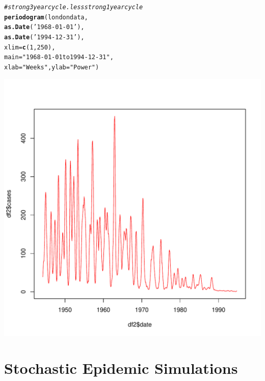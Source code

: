 \documentclass[12pt]{article}\usepackage[]{graphicx}\usepackage[]{color}
\makeatletter
\def\maxwidth{ %
  \ifdim\Gin@nat@width>\linewidth
    \linewidth
  \else
    \Gin@nat@width
  \fi
}
\newcommand{\hlnum}[1]{\textcolor[rgb]{0.686,0.059,0.569}{#1}}%
\newcommand{\hlstr}[1]{\textcolor[rgb]{0.192,0.494,0.8}{#1}}%
\newcommand{\hlcom}[1]{\textcolor[rgb]{0.678,0.584,0.686}{\textit{#1}}}%
\newcommand{\hlstd}[1]{\textcolor[rgb]{0.345,0.345,0.345}{#1}}%
\newcommand{\hlkwc}[1]{\textcolor[rgb]{0.333,0.667,0.333}{#1}}%
\newcommand{\hlkwd}[1]{\textcolor[rgb]{0.737,0.353,0.396}{\textbf{#1}}}%
\newenvironment{kframe}{%
 \def\at@end@of@kframe{}%
 \ifinner\ifhmode%
  \def\at@end@of@kframe{\end{minipage}}%
  \begin{minipage}{\columnwidth}%
 \fi\fi%
 \def\FrameCommand##1{\hskip\@totalleftmargin \hskip-\fboxsep
 \colorbox{shadecolor}{##1}\hskip-\fboxsep
     \hskip-\linewidth \hskip-\@totalleftmargin \hskip\columnwidth}%
 \MakeFramed {\advance\hsize-\width
   \@totalleftmargin\z@ \linewidth\hsize
   \@setminipage}}%
 {\par\unskip\endMakeFramed%
 \at@end@of@kframe}
\newenvironment{knitrout}{}{} %
\makeatother
\begin{document}
\begin{enumerate}[(a)]
\begin{knitrout}
\begin{kframe}
\begin{alltt}
\hlcom{#strong 3 year cycle. less strong 1 year cycle}
\hlkwd{periodogram}\hlstd{(londondata,}
            \hlkwd{as.Date}\hlstd{(}\hlstr{'1968-01-01'}\hlstd{),}
            \hlkwd{as.Date}\hlstd{(}\hlstr{'1994-12-31'}\hlstd{),}
            \hlkwc{xlim}\hlstd{=}\hlkwd{c}\hlstd{(}\hlnum{1}\hlstd{,}\hlnum{250}\hlstd{),}
            \hlkwc{main}\hlstd{=}\hlstr{"1968-01-01 to 1994-12-31"}\hlstd{,}
            \hlkwc{xlab}\hlstd{=}\hlstr{"Weeks"}\hlstd{,} \hlkwc{ylab}\hlstd{=}\hlstr{"Power"}\hlstd{)}
\end{alltt}
\end{kframe}
\includegraphics[width=\maxwidth]{figure/unnamed-chunk-5-2} 

\end{knitrout}

\end{enumerate}

\section{Stochastic Epidemic Simulations}

\SEintro
\end{document}

